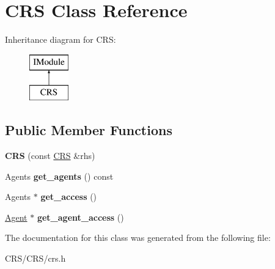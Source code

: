 \hypertarget{class_c_r_s}{}\section{C\+RS Class Reference}
\label{class_c_r_s}
Inheritance diagram for C\+RS\+:\begin{figure}[H]
\begin{center}
\leavevmode
\includegraphics[height=2.000000cm]{class_c_r_s}
\end{center}
\end{figure}
\subsection*{Public Member Functions}
\begin{DoxyCompactItemize}
\item 
\mbox{\label{class_c_r_s_a2e002dd3b25f3a9b6c1dadea016973b4}} 
{\bfseries C\+RS} (const \hyperlink{class_c_r_s}{C\+RS} \&rhs)
\item 
\mbox{\label{class_c_r_s_a57dab3b0c599d457eb3141aa7bb476d1}} 
Agents {\bfseries get\+\_\+agents} () const
\item 
\mbox{\label{class_c_r_s_a8dc965db0f0c2e3a377151fa714ab862}} 
Agents $\ast$ {\bfseries get\+\_\+access} ()
\item 
\mbox{\label{class_c_r_s_a419532b81dc8da7c7081cb7da08c3b49}} 
\hyperlink{class_agent}{Agent} $\ast$ {\bfseries get\+\_\+agent\+\_\+access} ()
\end{DoxyCompactItemize}


The documentation for this class was generated from the following file\+:\begin{DoxyCompactItemize}
\item 
C\+R\+S/\+C\+R\+S/crs.\+h\end{DoxyCompactItemize}
